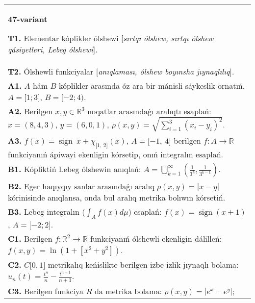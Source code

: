 \documentclass{article}
\DeclareMathOperator{\sign}{sign}
\begin{document}
\begin{tabular}{m{17cm}}
\textbf{47-variant}
\newline

\textbf{T1.} Elementar kóplikler ólshewi [\textit{sırtqı ólshew, sırtqı ólshew qásiyetleri, Lebeg ólshewi}]. \\
\textbf{T2.} Ólshewli funkciyalar [\textit{anıqlaması, ólshew boyınsha jıynaqlılıq}]. \\
\textbf{A1.} \(A\) hám \(B\) kóplikler arasında óz ara bir mánisli sáykeslik ornatıń. \(A = \lbrack 1;3\rbrack\), \(B = \lbrack - 2;4)\). \\
\textbf{A2.} Berilgen \(x,y \in \mathbb{R}^{3}\) noqatlar arasındaǵı aralıqtı esaplań: \(x = (8,4,3)\), \(y = (6,0,1)\), \(\rho(x,y) = \sqrt{{\sum_{i = 1}^{3}\left( x_{i} - y_{i} \right)^{2}}}\). \\
\textbf{A3.} \(f(x) = \sign \ x + \chi_{\lbrack 1,\ 2\rbrack}(x)\), \(A = \lbrack - 1,\ 4\rbrack\) berilgen \(f:A\rightarrow\mathbb{R}\) funkciyanıń ápiwayi ekenligin kórsetip, onıń integralın esaplań. \\
\textbf{B1.} Kópliktiń Lebeg ólshewin anıqlań: \(A = \bigcup_{k = 1}^{\infty}\left( \frac{1}{3^{k}},\frac{1}{3^{k - 1}} \right)\). \\
\textbf{B2.} Eger haqıyqıy sanlar arasındaǵı aralıq \(\rho(x,y) = |x - y|\) kórinisinde anıqlansa, onda bul aralıq metrika bolıwın kórsetiń. \\
\textbf{B3.} Lebeg integralın (\(\int_{A}^{}{f(x)d\mu}\)) esaplań: \(f(x) = \sign(x + 1)\), \(A = \lbrack - 2;2\rbrack\). \\
\textbf{C1.} Berilgen \(f:\mathbb{R}^{2}\mathbb{\rightarrow R}\) funkciyanıń ólshewli ekenligin dálilleń: \(f(x,y) = \ln\left( 1 + \left\lbrack x^{2} + y^{2} \right\rbrack \right)\). \\
\textbf{C2.} \(C\lbrack 0,1\rbrack\) metrikalıq keńislikte berilgen izbe izlik jıynaqlı bolama: \(u_{n}(t) = \frac{t^{n}}{n} - \frac{t^{n + 1}}{n + 1}\). \\
\textbf{C3.} Berilgen funkciya \(R\) da metrika bolama: \(\rho(x,y) = \left| e^{x} - e^{y} \right|\); \\

\end{tabular}
\vspace{1cm}
\end{document}
